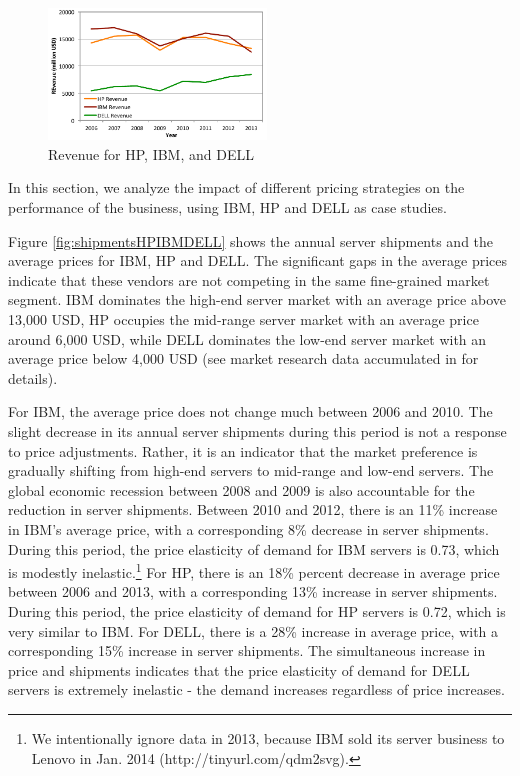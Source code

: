 \documentclass[10pt,journal,cspaper,compsoc]{IEEEtran}
\begin{document}
\begin{figure}[t!]
\centering
\includegraphics[height=3.5cm]{fig09}
\caption{Revenue for HP, IBM, and DELL}
\label{fig:revenueHPIBMDELL}
\end{figure}


In this section, we analyze the impact of different pricing strategies on the performance of the business, using IBM, HP and DELL as case studies.  

Figure \ref{fig:shipmentsHPIBMDELL} shows the annual server shipments and the average prices for IBM, HP and DELL. The significant gaps in the average prices indicate that these vendors are not competing in the same fine-grained market segment. IBM dominates the high-end server market with an average price above 13,000 USD, HP occupies the mid-range server market with an average price around 6,000 USD, while DELL dominates the low-end server market with an average price below 4,000 USD (see market research data accumulated in \cite{qyjohn} for details). 

For IBM, the average price does not change much between 2006 and 2010. The slight decrease in its annual server shipments during this period is not a response to price adjustments. Rather, it is an indicator that the market preference is gradually shifting from high-end servers to mid-range and low-end servers. The global economic recession between 2008 and 2009 is also accountable for the reduction in server shipments. Between 2010 and 2012, there is an 11\% increase in IBM's average price, with a corresponding 8\% decrease in server shipments. During this period, the price elasticity of demand for IBM servers is 0.73, which is modestly inelastic.\footnote{We intentionally ignore data in 2013, because IBM sold its server business to Lenovo in Jan. 2014 (http://tinyurl.com/qdm2svg).} For HP, there is an 18\% percent decrease in average price between 2006 and 2013, with a corresponding 13\% increase in server shipments. During this period, the price elasticity of demand for HP servers is 0.72, which is very similar to IBM. For DELL, there is a 28\% increase in average price, with a corresponding 15\% increase in server shipments. The simultaneous increase in price and shipments indicates that the price elasticity of demand for DELL servers is extremely inelastic - the demand increases regardless of price increases. 
\end{document}
